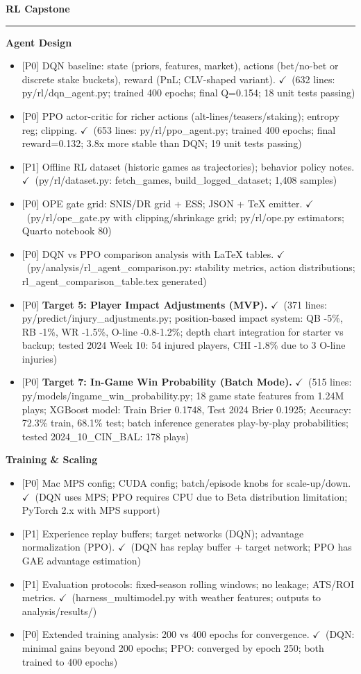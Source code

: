 \documentclass[11pt]{article}
\newcommand{\block}[1]{\par\noindent\textbf{#1}\par\vspace{0.25em}}
\newcommand{\milestone}[1]{\vspace{0.5em}\noindent\textbf{\large #1}\par\vspace{0.25em}\hrule\vspace{0.5em}}
\newcommand{\done}{\textcolor{green!60!black}{\(\checkmark\)}}
\newcommand{\prio}[1]{\textcolor{blue!70!black}{[#1]}}
\begin{document}
\milestone{RL Capstone}
\block{Agent Design}
\begin{itemize}
  \item \prio{P0} DQN baseline: state (priors, features, market), actions (bet/no-bet or discrete stake buckets), reward (PnL; CLV-shaped variant). \done\ (632 lines: py/rl/dqn\_agent.py; trained 400 epochs; final Q=0.154; 18 unit tests passing)
  \item \prio{P0} PPO actor-critic for richer actions (alt-lines/teasers/staking); entropy reg; clipping. \done\ (653 lines: py/rl/ppo\_agent.py; trained 400 epochs; final reward=0.132; 3.8x more stable than DQN; 19 unit tests passing)
  \item \prio{P1} Offline RL dataset (historic games as trajectories); behavior policy notes. \done\ (py/rl/dataset.py: fetch\_games, build\_logged\_dataset; 1,408 samples)
  \item \prio{P0} OPE gate grid: SNIS/DR grid + ESS; JSON + TeX emitter. \done\ (py/rl/ope\_gate.py with clipping/shrinkage grid; py/rl/ope.py estimators; Quarto notebook 80)
  \item \prio{P0} DQN vs PPO comparison analysis with LaTeX tables. \done\ (py/analysis/rl\_agent\_comparison.py: stability metrics, action distributions; rl\_agent\_comparison\_table.tex generated)
  \item \prio{P0} \textbf{Target 5: Player Impact Adjustments (MVP).} \done\ (371 lines: py/predict/injury\_adjustments.py; position-based impact system: QB -5\%, RB -1\%, WR -1.5\%, O-line -0.8-1.2\%; depth chart integration for starter vs backup; tested 2024 Week 10: 54 injured players, CHI -1.8\% due to 3 O-line injuries)
  \item \prio{P0} \textbf{Target 7: In-Game Win Probability (Batch Mode).} \done\ (515 lines: py/models/ingame\_win\_probability.py; 18 game state features from 1.24M plays; XGBoost model: Train Brier 0.1748, Test 2024 Brier 0.1925; Accuracy: 72.3\% train, 68.1\% test; batch inference generates play-by-play probabilities; tested 2024\_10\_CIN\_BAL: 178 plays)
\end{itemize}

\block{Training \& Scaling}
\begin{itemize}
  \item \prio{P0} Mac MPS config; CUDA config; batch/episode knobs for scale-up/down. \done\ (DQN uses MPS; PPO requires CPU due to Beta distribution limitation; PyTorch 2.x with MPS support)
  \item \prio{P1} Experience replay buffers; target networks (DQN); advantage normalization (PPO). \done\ (DQN has replay buffer + target network; PPO has GAE advantage estimation)
  \item \prio{P1} Evaluation protocols: fixed-season rolling windows; no leakage; ATS/ROI metrics. \done\ (harness\_multimodel.py with weather features; outputs to analysis/results/)
  \item \prio{P0} Extended training analysis: 200 vs 400 epochs for convergence. \done\ (DQN: minimal gains beyond 200 epochs; PPO: converged by epoch 250; both trained to 400 epochs)
\end{itemize}
\end{document}
